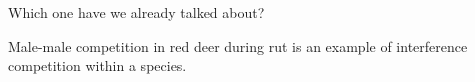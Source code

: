 \documentclass[
  letterpaper,
  DIV=11,
  numbers=noendperiod]{scrartcl}
\begin{document}
\begin{figure}

\begin{minipage}[t]{0.50\linewidth}

{\centering 


}

\end{minipage}%
%
\begin{minipage}[t]{0.50\linewidth}

{\centering 


}

\end{minipage}%

\end{figure}

Which one have we already talked about?

Male-male competition in red deer during rut is an example of
interference competition within a species.
\end{document}
